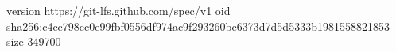 version https://git-lfs.github.com/spec/v1
oid sha256:c4cc798cc0e99fbf0556df974ac9f293260bc6373d7d5d5333b1981558821853
size 349700
